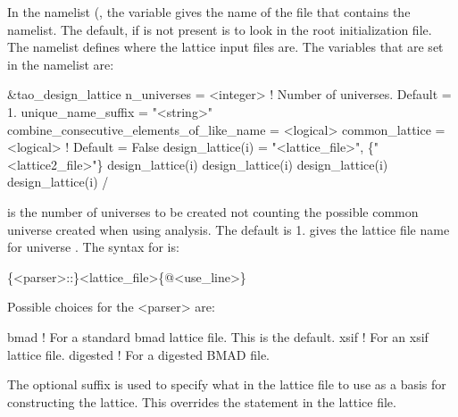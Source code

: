 In the  namelist (, the  variable gives the name
of the file that contains the  namelist. The default, if  is
not present is to look in the \tao root initialization file. The  namelist
defines where the lattice input files are. The variables that are set in the 
namelist are:
\begin{example}
  &tao_design_lattice
    n_universes        = <integer>      ! Number of universes. Default = 1.
    unique_name_suffix = "<string>"
    combine_consecutive_elements_of_like_name = <logical>
    common_lattice = <logical>                        ! Default = False
    design_lattice(i) = "<lattice_file>", \{"<lattice2_file>"\}
    design_lattice(i)%
    design_lattice(i)%
    design_lattice(i)%
    design_lattice(i)%
  /
\end{example}

 is the number of universes to be created not counting
the possible common universe created when using  analysis. The
default is 1.   gives the lattice file name for
universe .  
The syntax for  is:
\begin{example}
  \{<parser>::\}<lattice_file>\{@<use_line>\}
\end{example}
Possible choices for the <parser> are:
\begin{example}
  bmad      ! For a standard bmad lattice file. This is the default.
  xsif      ! For an xsif lattice file.
  digested  ! For a digested BMAD file.
\end{example}
The  optional suffix is used to specify what  in the lattice file to use as
a basis for constructing the lattice. This overrides the  statement in the lattice file.

